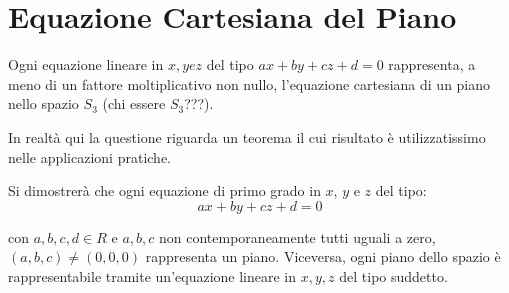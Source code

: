\section{Equazione Cartesiana del Piano}
\begin{definizione}
Ogni equazione lineare in $x,y e z$ del tipo $ax+by+cz+d=0$ rappresenta, a meno di un fattore moltiplicativo non nullo,
l'equazione cartesiana di un piano nello spazio $S_3$ (chi essere $S_3$???).
\end{definizione}

\begin{osservazione}
In realtà qui la questione riguarda un teorema il cui risultato è utilizzatissimo nelle applicazioni pratiche.

Si dimostrerà che ogni equazione di primo grado in $x$, $y$ e $z$ del tipo:
\[
 ax+by+cz+d=0
\]

con $a,b,c,d \in R$ e $a,b,c$ non contemporaneamente tutti uguali a zero, $(a,b,c) \ne (0,0,0)$ rappresenta un piano. 
Viceversa, ogni piano dello spazio è rappresentabile tramite un'equazione lineare in $x,y,z$ del tipo suddetto.
\end{osservazione}



